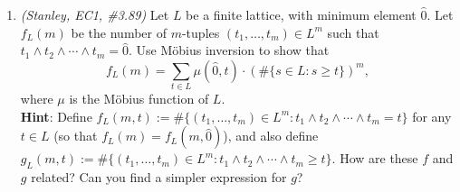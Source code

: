 \documentclass[11pt]{article}
\begin{document}
\begin{enumerate}
\item \emph{(Stanley, EC1, \#3.89)} Let $L$ be a finite lattice, with minimum element $\hat{0}$. Let $f_L(m)$ be the number of $m$-tuples $(t_1,\ldots,t_m)\in L^m$ such that $t_1 \wedge t_2 \wedge \cdots \wedge t_m = \hat{0}$. Use M\"{o}bius inversion to show that
\[ f_L(m) = \sum_{t\in L} \mu(\hat{0},t) \cdot (\#\{s\in L\colon s \geq t\})^m,\]
where $\mu$ is the M\"{o}bius function of $L$. \\
{\bf Hint}: Define $f_L(m,t) := \#\{(t_1,\ldots,t_m)\in L^m\colon t_1 \wedge t_2 \wedge \cdots \wedge t_m = t\}$ for any $t \in L$ (so that $f_L(m)=f_L(m,\hat{0})$), and also define $g_L(m,t) := \#\{(t_1,\ldots,t_m)\in L^m\colon t_1 \wedge t_2 \wedge \cdots \wedge t_m \geq t\}$. How are these $f$ and $g$ related? Can you find a simpler expression for $g$?

\end{enumerate}
\end{document}
